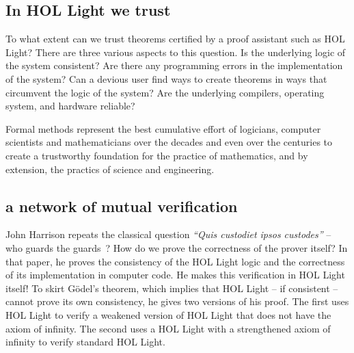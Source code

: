 \documentclass{llncs}
\begin{document}














\subsection{In HOL Light we trust}

To what extent can we trust theorems certified by a proof assistant
such as HOL Light?  There are three various aspects to this question.
Is the underlying logic of the system consistent?  Are there any
programming errors in the implementation of the system?  Can a devious
user find ways to create theorems in ways that circumvent the logic of
the system?  Are the underlying compilers, operating system, and
hardware reliable?

Formal methods represent the best cumulative effort of
logicians, computer scientists and mathematicians over the decades and
even over the centuries to create a trustworthy foundation for the
practice of mathematics, and by extension, the practics of science and
engineering.  

\subsection{a network of mutual verification}

John Harrison
repeats the classical question
{\it ``Quis custodiet ipsos custodes''} -- who guards the
guards~\cite{HaSelf}?  How do we prove the correctness of the prover
itself?  In that paper, he proves the consistency of the HOL Light
logic and the correctness of its implementation in computer code.  He
makes this verification in HOL Light itself!  To skirt G\"odel's
theorem, which implies that HOL Light -- if consistent -- cannot prove
its own consistency, he gives two versions of his proof.  The first
uses HOL Light to verify a weakened version of HOL Light that does not
have the axiom of infinity.  The second uses a HOL Light with a
strengthened axiom of infinity to verify standard HOL Light.
\end{document}

